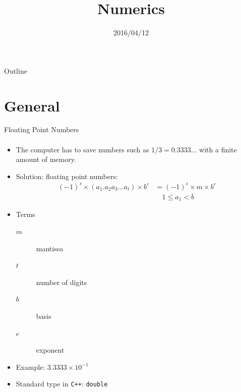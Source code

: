\documentclass[presentation]{beamer}
\author{}
\date{2016/04/12}
\title{Numerics}
\begin{document}
\maketitle

\begin{frame}{Outline}
\framesubtitle{}

\tableofcontents

\end{frame}



\section{General}

\begin{frame}{Floating Point Numbers}
\framesubtitle{}


\begin{itemize}
\item The computer has to save numbers such as $1/3 = 0.3333 \ldots$
  with a finite amount of memory.
\item Solution: floating point numbers:
  \begin{align*}
    (-1)^{s} \times (a_{1}.a_{2}a_{3}\ldots a_{t}) \times b^{e} &=
    (-1)^{s}\times m \times b^{e} \\ & \quad 1 \le a_{1} < b
  \end{align*}
\item Terms
  \begin{description}
  \item[$m$] mantissa
  \item[$t$] number of digits
  \item[$b$] basis
  \item[$e$] exponent
  \end{description}
\item Example: $3.3333 \times 10^{-1}$
\item Standard type in \texttt{C++}: \texttt{double}
\end{itemize}

\end{frame}
\end{document}
